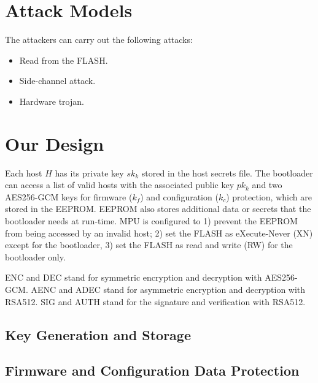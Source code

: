 \documentclass[11pt,oneside,onecolumn,letterpaper]{article}
\begin{document}
\section{Attack Models}

The attackers can carry out the following attacks:

\begin{itemize}
  \item Read from the FLASH.
  \item Side-channel attack.
  \item Hardware trojan.
\end{itemize}


\section{Our Design}

Each host $H$ has its private key $sk_k$ stored in the host secrets file.
The bootloader can access a list of valid hosts with the associated public key $pk_k$ and two AES256-GCM keys for firmware ($k_f$) and configuration ($k_c$) protection, which are stored in the EEPROM.
EEPROM also stores additional data or secrets that the bootloader needs at run-time.
MPU is configured to 1) prevent the EEPROM from being accessed by an invalid host; 2) set the FLASH as eXecute-Never (XN) except for the bootloader, 3) set the FLASH as read and write (RW) for the bootloader only. 

ENC and DEC stand for symmetric encryption and decryption with AES256-GCM.
AENC and ADEC stand for asymmetric encryption and decryption with RSA512.
SIG and AUTH stand for the signature and verification with RSA512.

\subsection{Key Generation and Storage}

\subsection{Firmware and Configuration Data Protection}
\end{document}
